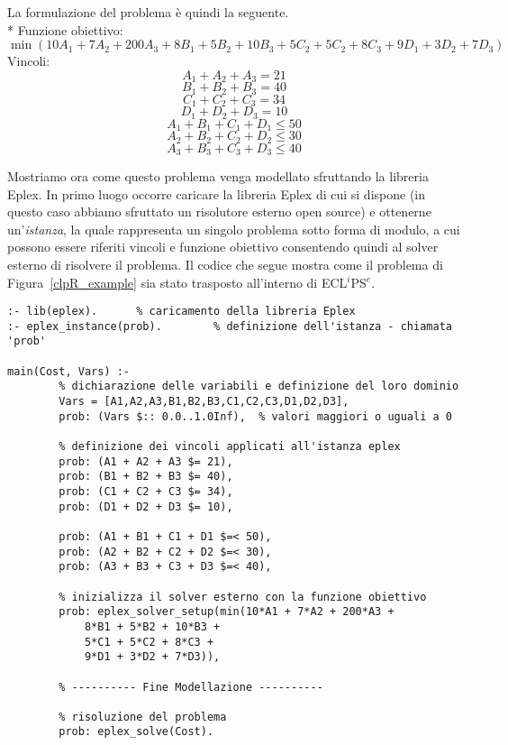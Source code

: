La formulazione del problema è quindi la seguente.\\*
Funzione obiettivo: 
\begin{equation}  \label{exampleClpRObiett}
	\min(10A_1+7A_2+200A_3+8B_1+5B_2+10B_3+5C_2+5C_2+8C_3+9D_1+3D_2+7D_3)
\end{equation}
Vincoli:
\begin{equation}  \label{exampleCons1}
	A_1+A_2+A_3=21
\end{equation}
\begin{equation}  \label{exampleCons2}
	B_1+B_2+B_3=40
\end{equation}
\begin{equation}  \label{exampleCons3}
	C_1+C_2+C_3=34
\end{equation}
\begin{equation}  \label{exampleCons4}
	D_1+D_2+D_3=10
\end{equation}
\begin{equation}  \label{exampleCons5}
	A_1+B_1+C_1+D_1 \leq 50
\end{equation}
\begin{equation}  \label{exampleCons6}
	A_2+B_2+C_2+D_2 \leq 30
\end{equation}
\begin{equation}  \label{exampleCons7}
	A_3+B_3+C_3+D_3 \leq 40
\end{equation}

Mostriamo ora come questo problema venga modellato sfruttando la libreria Eplex. In primo luogo occorre caricare la libreria Eplex di cui si dispone (in questo caso abbiamo sfruttato un risolutore esterno open source) e ottenerne un'\emph{istanza}, la quale rappresenta un singolo problema sotto forma di modulo, a cui possono essere riferiti vincoli e funzione obiettivo consentendo quindi al solver esterno di risolvere il problema. Il codice che segue mostra come il problema di Figura~\ref{clpR_example} sia stato trasposto all'interno di ECL$^i$PS$^e$.

\begin{lstlisting}
:- lib(eplex).		% caricamento della libreria Eplex
:- eplex_instance(prob).		% definizione dell'istanza - chiamata 'prob'

main(Cost, Vars) :-
		% dichiarazione delle variabili e definizione del loro dominio		
		Vars = [A1,A2,A3,B1,B2,B3,C1,C2,C3,D1,D2,D3],
		prob: (Vars $:: 0.0..1.0Inf),  % valori maggiori o uguali a 0
		
		% definizione dei vincoli applicati all'istanza eplex
		prob: (A1 + A2 + A3 $= 21), 
		prob: (B1 + B2 + B3 $= 40),
		prob: (C1 + C2 + C3 $= 34),
		prob: (D1 + D2 + D3 $= 10),

		prob: (A1 + B1 + C1 + D1 $=< 50),
		prob: (A2 + B2 + C2 + D2 $=< 30),
		prob: (A3 + B3 + C3 + D3 $=< 40),

		% inizializza il solver esterno con la funzione obiettivo
		prob: eplex_solver_setup(min(10*A1 + 7*A2 + 200*A3 + 
			8*B1 + 5*B2 + 10*B3 +
		 	5*C1 + 5*C2 + 8*C3 +
		 	9*D1 + 3*D2 + 7*D3)),

		% ---------- Fine Modellazione ----------

		% risoluzione del problema
		prob: eplex_solve(Cost).
\end{lstlisting}

